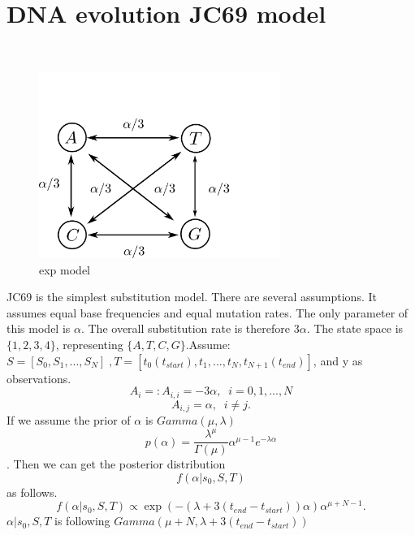 \section{DNA evolution JC69 model }~
  \begin{figure}[H]
  \centering
  \begin{minipage}[!hp]{0.45\linewidth}
  \centering
    \includegraphics [width=0.70\textwidth, angle=0]{figs/jc_model.pdf}
      \end{minipage}
    \caption{exp model}
  \end{figure}

JC69 is the simplest substitution model. There are several assumptions. It assumes equal base frequencies and equal mutation rates. The only parameter of this model is $\alpha$. The overall substitution rate is therefore $3\alpha$. The state space is $\{1, 2, 3, 4\}$, representing $\{A, T, C, G\}$.\noindent Assume: $S = [S_0,S_1, ...,S_N] \;, T = [t_0(t_{start}), t_1,...,t_N, t_{N+1}(t_{end})]$, and y as observations.\\
$$A_i =: A_{i,i} = -3\alpha, \; \; i =0,1,...,N$$ $$A_{i, j} = \alpha, \; \; i \neq j.$$
If we assume the prior of $\alpha$ is $Gamma(\mu,\lambda)$\\
$$p(\alpha) = \frac{\lambda^\mu}{\Gamma(\mu)}\alpha^{\mu -1}e^{-\lambda \alpha} $$.
Then we can get the posterior distribution $$f(\alpha | s_0,S,T)$$ as follows.
$$ f(\alpha| s_0,S,T) \propto \exp(-(\lambda + 3(t_{end} - t_{start}))\alpha) \alpha^{\mu + N -1} .$$
$\alpha | s_0,S,T$ is following $Gamma(\mu+ N,\lambda + 3(t_{end} - t_{start}))$\\
